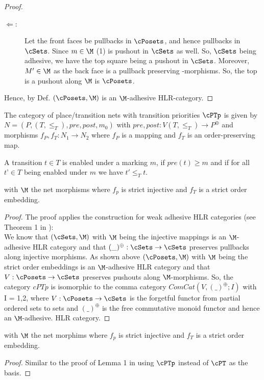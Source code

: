 \begin{proof}
\begin{enumerate}
\begin{description}
   \item[$\Leftarrow$:] Let the front faces be pullbacks in $\cPosets$, and hence pullbacks in $\cSets$. Since $m \in \M$
	      (1) is pushout in $\cSets$ as well. So, $\cSets$ being adhesive, we have the top square being a pushout 
				in $\cSets$. Moreover, $M'\in \M$ as the back face is a pullback  preserving \M-morphisms. So, the top
				is a pushout along $\M$ is $\cPosets$.
 \end{description}

\end{enumerate}
    Hence, by Def. \label{d.madHLR}  $(\cPosets,\M)$ is an $\M$-adhesive HLR-category.
\end{proof}



\begin{definition}
   The category of  place/transition nets with  transition priorities $\cPTp$  is given by $N=(P,(T,\le_T), pre, post, m_0)$
	with $pre, post: V(T,\le_T) \to P^\oplus$ and
	morphisms $f_P,f_T: N_1 \to N_2$ where $f_P$ is a mapping and $f_T$ is an order-preserving map.
	
	A transition $t\in T$ is enabled under a marking $m$, if $pre(t) \ge m $ and if for all $t’\in T$ being enabled under $m$ we have $t'\le_T t$.
\end{definition}

\begin{lemma}
  \label{l.madHLr_PTp}
	 with $\M$ the net morphisms where $f_p$ is strict injective and $f_T$
	is a strict order embedding. 
  \end{lemma}
	
	\begin{proof}
The proof applies the construction for weak adhesive HLR categories (see Theorem 1 in \cite{PEL08}):\\
	 We know that  $(\cSets,\M)$  with $\M$ being the injective mappings is an $\M$-adhesive
HLR category and that $ (\_)^\oplus: \cSets \to \cSets$ preserves pullbacks along injective morphisms.
 As shown above $(\cPosets,\M)$  with $\M$ being the strict order embeddings is an $\M$-adhesive  
HLR category and that $V: \cPosets \to \cSets$ preserves pushouts along $\M$-morphisms.
So, the category $cPTp$ is isomorphic to the comma category $ComCat(V,(\_)^\oplus;I)$ with I = {1,2}, where $V: \cPosets \to \cSets$ is the forgetful functor from partial ordered sets to sets and $(\_)^\oplus$ is the free commutative
monoid functor and hence  an $\M$-adhesive.  
HLR category.
	\end{proof}


\begin{lemma}
  \label{l.madHLr_PTp}
	 with $\M$ the net morphims where $f_p$ is strict injective and $f_T$
	is a strict order embedding. 
  \end{lemma}
	\begin{proof}
	Similar to the proof of Lemma 1 in \cite{Pad12} using $\cPTp$ instead of $ \cPT$ as the basis.\end{proof}